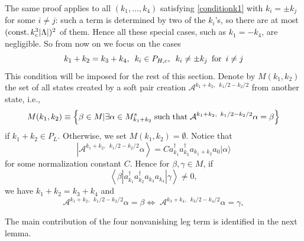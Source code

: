 \documentclass[11pt]{article}
\numberwithin{equation}{section}
\newcommand{\beq}{\begin{equation}}
\newcommand{\eeq}{\end{equation}}
\newcommand\const{{\rm const.\, }}
\newcommand\al{{\alpha}}
\newcommand\be{\beta}
\theoremstyle{definition}
\begin{document}
 
The same proof applies to all $(k_1, \ldots, k_4)$ satisfying \eqref{conditionk1} with $k_i=\pm k_j$ for some $i\neq j$: such a term is determined by two of the $k_i$'s, so there are at most $(\const k_c^3|\Lambda|)^2$ of them. Hence all these special cases, such as $k_1=-k_4$, are negligible. So from now on we focus on the cases
\beq\label{conditionk2}
k_1+k_2=k_3+k_4,\,\,\,k_i\in P_{H,c},\,\,\,k_i\neq\pm k_j\,\,\,{\rm for}\,\,\, i\neq j
\eeq 
This condition will be imposed for the rest of this section. 
Denote by  $M(k_1,k_2)$ the set of all states created by  a soft pair creation $\mathcal A^{k_1+k_2,\,\,\, k_1/2-k_2/2}$ from another  state, i.e., 
\beq
M(k_1,k_2)\equiv\left\{\be\in M | \exists \al\in M^s_{k_1+k_2} {\rm \; such \; that \;}  \mathcal A^{k_1+k_2,\,\,\, k_1/2-k_2/2}\al=\be\right\}
\eeq
if $k_1+k_2 \in P_L$. Otherwise, we set  $M(k_1,k_2)=\emptyset$.
Notice that $$\left|\mathcal A^{k_1+k_2,\,\,\, k_1/2-k_2/2} \alpha\right\rangle = C  a^\dagger_{k_1}a^\dagger_{k_2}a_{k_1+k_2}a_0 | \alpha\rangle$$
for some normalization constant $C$. Hence for $\beta, \gamma \in M$, if $$\left\langle\be| a^\dagger_{k_1}a^\dagger_{k_2}a_{k_3}a_{k_4}|\gamma\right\rangle\neq 0,$$ 
we have $k_1+k_2=k_3+k_4$ and 
\beq\label{11.1}
\mathcal A^{k_1+k_2,\,\,\, k_1/2-k_2/2}\al=\be\Leftrightarrow  \; \mathcal A^{k_3+k_4,\,\,\, k_3/2-k_4/2}\al=\gamma,   
\eeq

The main contribution of the four nonvanishing leg term is identified in the next lemma. 
\end{document}
